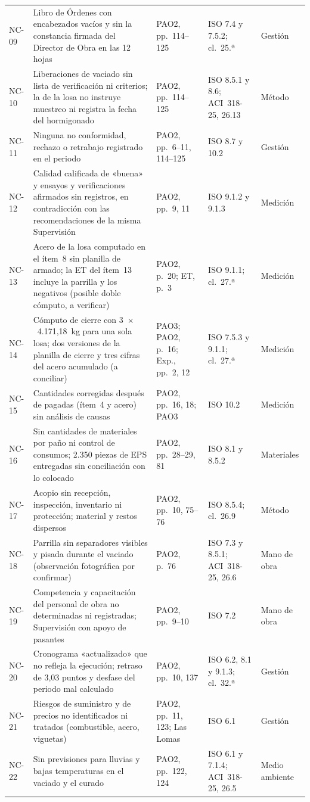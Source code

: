 \begin{longtable}{@{}P{1.3cm}P{5.7cm}P{2.6cm}P{3.6cm}P{2.0cm}@{}}
NC-09 & Libro de Órdenes con encabezados vacíos y sin la constancia firmada del Director de Obra en las 12 hojas & PAO2, pp.~114--125 & ISO 7.4 y 7.5.2; cl.~25.ª & Gestión \\
NC-10 & Liberaciones de vaciado sin lista de verificación ni criterios; la de la losa no instruye muestreo ni registra la fecha del hormigonado & PAO2, pp.~114--125 & ISO 8.5.1 y 8.6; ACI~318-25, 26.13 & Método \\
NC-11 & Ninguna no conformidad, rechazo o retrabajo registrado en el periodo & PAO2, pp.~6--11, 114--125 & ISO 8.7 y 10.2 & Gestión \\
NC-12 & Calidad calificada de «buena» y ensayos y verificaciones afirmados sin registros, en contradicción con las recomendaciones de la misma Supervisión & PAO2, pp.~9, 11 & ISO 9.1.2 y 9.1.3 & Medición \\
NC-13 & Acero de la losa computado en el ítem~8 sin planilla de armado; la ET del ítem~13 incluye la parrilla y los negativos (posible doble cómputo, a verificar) & PAO2, p.~20; ET, p.~3 & ISO 9.1.1; cl.~27.ª & Medición \\
NC-14 & Cómputo de cierre con 3~$\times$~4.171,18~kg para una sola losa; dos versiones de la planilla de cierre y tres cifras del acero acumulado (a conciliar) & PAO3; PAO2, p.~16; Exp., pp.~2, 12 & ISO 7.5.3 y 9.1.1; cl.~27.ª & Medición \\
NC-15 & Cantidades corregidas después de pagadas (ítem~4 y acero) sin análisis de causas & PAO2, pp.~16, 18; PAO3 & ISO 10.2 & Medición \\
NC-16 & Sin cantidades de materiales por paño ni control de consumos; 2.350 piezas de EPS entregadas sin conciliación con lo colocado & PAO2, pp.~28--29, 81 & ISO 8.1 y 8.5.2 & Materiales \\
NC-17 & Acopio sin recepción, inspección, inventario ni protección; material y restos dispersos & PAO2, pp.~10, 75--76 & ISO 8.5.4; cl.~26.9 & Método \\
NC-18 & Parrilla sin separadores visibles y pisada durante el vaciado (observación fotográfica por confirmar) & PAO2, p.~76 & ISO 7.3 y 8.5.1; ACI~318-25, 26.6 & Mano de obra \\
NC-19 & Competencia y capacitación del personal de obra no determinadas ni registradas; Supervisión con apoyo de pasantes & PAO2, pp.~9--10 & ISO 7.2 & Mano de obra \\
NC-20 & Cronograma «actualizado» que no refleja la ejecución; retraso de 3,03 puntos y desfase del periodo mal calculado & PAO2, pp.~10, 137 & ISO 6.2, 8.1 y 9.1.3; cl.~32.ª & Gestión \\
NC-21 & Riesgos de suministro y de precios no identificados ni tratados (combustible, acero, viguetas) & PAO2, pp.~11, 123; Las Lomas & ISO 6.1 & Gestión \\
NC-22 & Sin previsiones para lluvias y bajas temperaturas en el vaciado y el curado & PAO2, pp.~122, 124 & ISO 6.1 y 7.1.4; ACI~318-25, 26.5 & Medio ambiente \\
\end{longtable}
